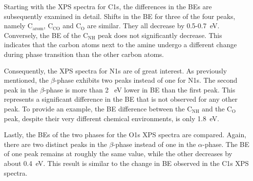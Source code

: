 Starting with the \ac{XPS} spectra for C1s, the differences in the \acp{BE} are subsequently examined in detail. Shifts in the \ac{BE} for three of the four peaks, namely $\mathrm{C_{arom}}$, $\mathrm{C_{CO}}$ and $\mathrm{C_{O}}$ are similar. They all decrease by 0.5-0.7~\si{\eV}. Conversely, the \ac{BE} of the $\mathrm{C_{NH}}$ peak does not significantly decrease. This indicates that the carbon atoms next to the amine undergo a different change during phase transition than the other carbon atoms.

Consequently, the \ac{XPS} spectra for N1s are of great interest. As previously mentioned, the $\beta$-phase exhibits two peaks instead of one for N1s. The second peak in the $\beta$-phase is more than 2 ~\si{\eV} lower in \ac{BE} than the first peak. This represents a significant difference in the \ac{BE} that is not observed for any other peak. To provide an example, the \ac{BE} difference between the $\mathrm{C_{NH}}$ and the $\mathrm{C_{O}}$ peak, despite their very different chemical environments, is only 1.8~\si{\eV}.

Lastly, the \acp{BE} of the two phases for the O1s \ac{XPS} spectra are compared. Again, there are two distinct peaks in the $\beta$-phase instead of one in the $\alpha$-phase. The \ac{BE} of one peak remains at roughly the same value, while the other decreases by about 0.4~\si{\eV}. This result is similar to the change in \ac{BE} observed in the C1s \ac{XPS} spectra.

\cleardoublepage
